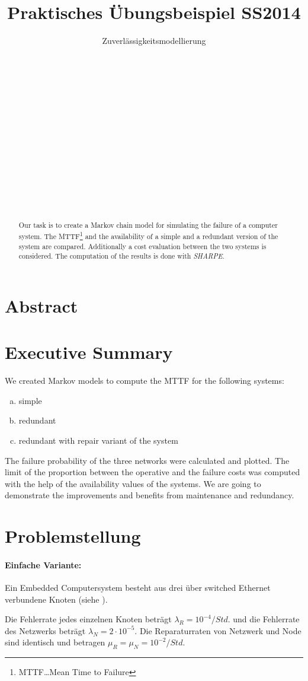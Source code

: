 \documentclass[
            a4paper
            ]{scrartcl}%
\title{Praktisches Übungsbeispiel SS2014}
\subtitle{Zuverlässigkeitsmodellierung}
\author{
 \authorname{Markus Kessler} \\
 \studentnumber{1225380} \\
 \curriculum{033 535}\\
 \email{e1225380@student.tuwien.ac.at}\\\\
 \authorname{Mathias Lechner} \\
 \studentnumber{1225134} \\
 \curriculum{033 535}\\
 \email{e1225134@student.tuwien.ac.at}\\\\
 \authorname{Martin Wührer} \\
 \studentnumber{1225177} \\
 \curriculum{033 535}\\
 \email{e1225177@student.tuwien.ac.at}
}
\begin{document}
\renewcommand*{\Frefeqname}{Gleichung}
\renewcommand*{\Freffigname}{Abbildung}
\renewcommand*{\Frefsecname}{Abschnitt}

\maketitle
\newpage

\tableofcontents
\newpage
\section{Abstract}
\begin{abstract}
Our task is to create a Markov chain model for simulating the failure of a
computer system. The MTTF\footnote{MTTF\dots Mean Time to Failure} and the 
availability of a simple and a redundant version of the system are compared. 
Additionally a cost evaluation between the two systems is considered.
The computation of the results is done with \emph{SHARPE}.
\end{abstract}

\section{Executive Summary}
We created Markov models to compute the MTTF for the following systems:
	\begin{enumerate}[a)]
		\item simple
		\item redundant
		\item redundant with repair variant of the system
	\end{enumerate}
	The failure probability of the three networks were calculated and plotted. The limit of the proportion between the operative and the failure costs was computed with the help of the availability values of the systems. We are going to demonstrate the improvements and benefits from maintenance and redundancy.
\newpage

\section{Problemstellung}
\paragraph{Einfache Variante:}
Ein Embedded Computersystem besteht aus drei über switched Ethernet verbundene
Knoten (siehe ).

Die Fehlerrate jedes einzelnen Knoten beträgt $\lambda_R=10^{-4}/Std.$ und die Fehlerrate
des Netzwerks beträgt $\lambda_N=2\cdot 10^{-5}$.
Die Reparaturraten von Netzwerk und Node sind identisch und betragen $\mu_R=\mu_N=10^{-2}/Std.$
\end{document}

